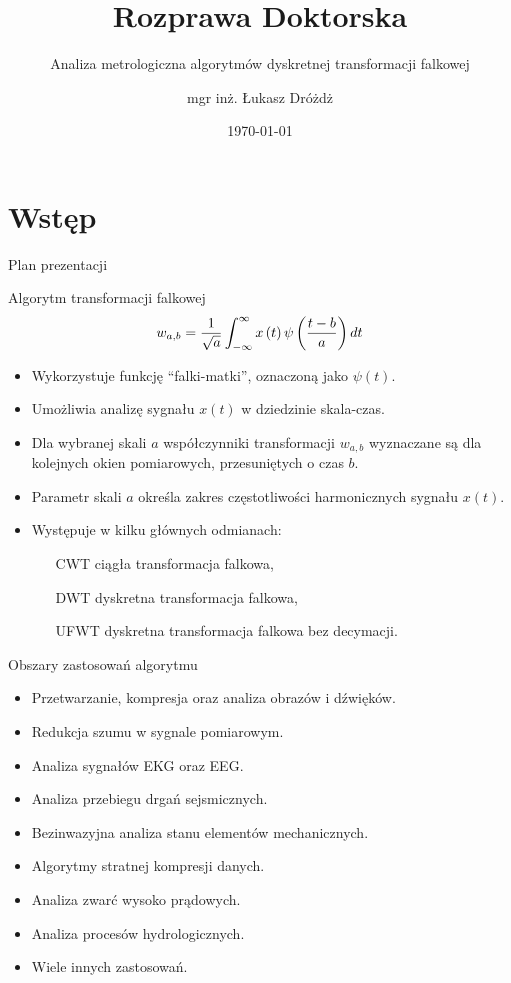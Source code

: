 \documentclass[12pt, polish, aspectratio = 169]{slides}
\title{Rozprawa Doktorska}
\author{mgr inż. Łukasz Dróżdż}
\subtitle{Analiza metrologiczna algorytmów dyskretnej transformacji falkowej}
\institute{Politechnika Śląska, Wydział Elektryczny \\ Katedra Metrologii, Elektroniki i Automatyki}
\date{\today}
\begin{document}
\section*{Wstęp}

\begin{frame}[plain]
\titlepage
\end{frame}

\begin{frame}{Plan prezentacji}
\tableofcontents
\end{frame}


\begin{frame}{Algorytm transformacji falkowej}
\begin{equation}
w_{a,b} = \frac{1}{\sqrt{a}} \int _{-\infty} ^{\infty} x \left(t\right) \psi \left(\frac{t-b}{a}\right) dt \label{eq:cwt}
\end{equation}
\begin{itemize}
\item Wykorzystuje funkcję \enquote{falki-matki}, oznaczoną jako $\psi(t)$.
\item Umożliwia analizę sygnału $x(t)$ w dziedzinie skala-czas.
\item Dla wybranej skali $a$ współczynniki transformacji $w_{a,b}$ wyznaczane są dla kolejnych okien pomiarowych, przesuniętych o czas $b$.
\item Parametr skali $a$ określa zakres częstotliwości harmonicznych sygnału $x(t)$.
\item Występuje w kilku głównych odmianach:
	\begin{itemize}
	\item[CWT] ciągła transformacja falkowa,
	\item[DWT] dyskretna transformacja falkowa,
	\item[UFWT] dyskretna transformacja falkowa bez decymacji.
	\end{itemize}
\end{itemize}
\end{frame}

\begin{frame}{Obszary zastosowań algorytmu}
\begin{itemize}
\item Przetwarzanie, kompresja oraz analiza obrazów i dźwięków.
\item Redukcja szumu w sygnale pomiarowym.
\item Analiza sygnałów EKG oraz EEG.
\item Analiza przebiegu drgań sejsmicznych.
\item Bezinwazyjna analiza stanu elementów mechanicznych.
\item Algorytmy stratnej kompresji danych.
\item Analiza zwarć wysoko prądowych.
\item Analiza procesów hydrologicznych.
\item Wiele innych zastosowań.
\end{itemize}
\end{frame}
\end{document}
